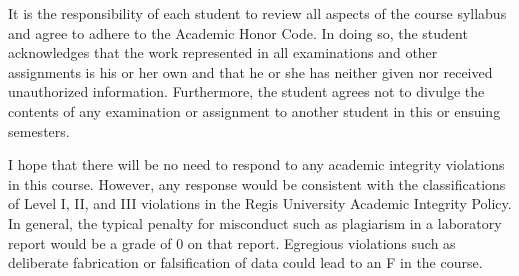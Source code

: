 \documentclass[11pt]{article}
\begin{document}
It is the responsibility of each student to review all aspects of the course syllabus and agree to adhere to the Academic Honor Code.  In doing so, the student acknowledges that the work represented in all examinations and other assignments is his or her own and that he or she has neither given nor received unauthorized information.  Furthermore, the student agrees not to divulge the contents of any examination or assignment to another student in this or ensuing semesters.  


I hope that there will be no need to respond to any academic integrity
violations in this course.  However, any response would be consistent with the
classifications of Level I, II, and III violations in the Regis University
Academic Integrity Policy.  In general, the typical penalty for misconduct
such as plagiarism in a laboratory report would be a grade of 0 on that report.
Egregious violations such as deliberate fabrication or falsification of data 
could lead to an F in the course.
\end{document}
